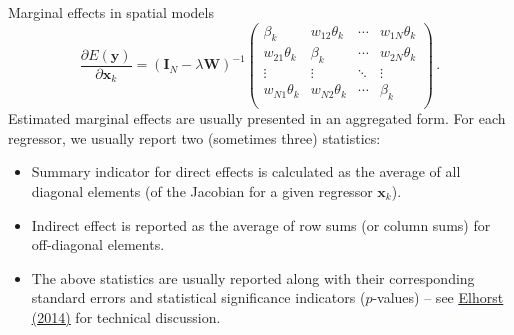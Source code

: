 \documentclass{beamer}
\begin{document}
\begin{frame}{Marginal effects in spatial models}
\begin{equation*}
\frac{\partial E(\bm{y})}{\partial \bm{x}_k}
    =(\bm{I}_N - \lambda \bm{W})^{-1}
	\begin{pmatrix}
		\beta_{k} & w_{12}\theta_{k}& \cdots & w_{1N}\theta_{k}\\
		w_{21}\theta_{k}& \beta_{k} & \cdots & w_{2N}\theta_{k}\\
		\vdots & \vdots & \ddots & \vdots \\
		w_{N1}\theta_{k} & w_{N2}\theta_{k} & \cdots & \beta_{k} \\
	\end{pmatrix}\,. 
\end{equation*}
Estimated marginal effects are usually presented in an aggregated form. For each regressor, we usually report two (sometimes three) statistics:
 \begin{itemize}
    \item Summary indicator for direct effects is calculated as the average of all diagonal elements (of the Jacobian for a given regressor $\bm{x}_k$). 
    \medskip
    \item Indirect effect is reported as the average of row sums (or column sums) for off-diagonal elements. 
    \medskip
    \item The above statistics are usually reported along with their corresponding standard errors and statistical significance indicators ($p$-values) -- see \textcolor{blue}{\underline{\href{https://link.springer.com/book/10.1007/978-3-642-40340-8}{Elhorst (2014)}}} for technical discussion.
\end{itemize}	
\end{frame}
\end{document}
